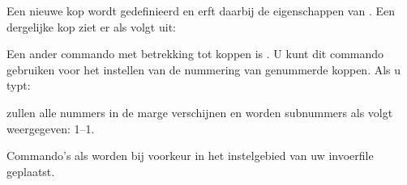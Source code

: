 \stopbuffer

\typebuffer

Een nieuwe kop \type{\mijnkop} wordt gedefinieerd en erft
daarbij de eigenschappen van \type{\paragraaf}. Een
dergelijke kop ziet er als volgt uit:

\haalbuffer

Een ander commando met betrekking tot koppen is
\type{\stelkoppenin}. U kunt dit commando gebruiken
voor het instellen van de nummering van genummerde koppen.
Als u typt:

\startbuffer
\stelkoppenin
  [variant=inmarge,
   scheider=--]
\stopbuffer

\typebuffer

zullen alle nummers in de marge verschijnen en worden
subnummers als volgt weergegeven: 1--1.

Commando's als \type{\stelkoppenin} worden bij voorkeur in
het instelgebied van uw invoerfile geplaatst.


\stoponderdeel
